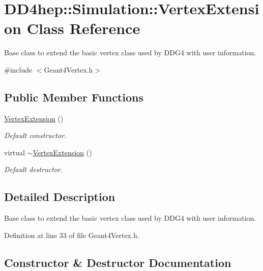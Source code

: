 \hypertarget{class_d_d4hep_1_1_simulation_1_1_vertex_extension}{}\section{D\+D4hep\+:\+:Simulation\+:\+:Vertex\+Extension Class Reference}
\label{class_d_d4hep_1_1_simulation_1_1_vertex_extension}


Base class to extend the basic vertex class used by D\+D\+G4 with user information.  




{\ttfamily \#include $<$Geant4\+Vertex.\+h$>$}

\subsection*{Public Member Functions}
\begin{DoxyCompactItemize}
\item 
\hyperlink{class_d_d4hep_1_1_simulation_1_1_vertex_extension_a5e6f2f75331b2ce06e47e37af6d8e413}{Vertex\+Extension} ()
\begin{DoxyCompactList}\small\item\em Default constructor. \end{DoxyCompactList}\item 
virtual \hyperlink{class_d_d4hep_1_1_simulation_1_1_vertex_extension_ada5f206230fe61718826c4cfe8eb7e9e}{$\sim$\+Vertex\+Extension} ()
\begin{DoxyCompactList}\small\item\em Default destructor. \end{DoxyCompactList}\end{DoxyCompactItemize}


\subsection{Detailed Description}
Base class to extend the basic vertex class used by D\+D\+G4 with user information. 

Definition at line 33 of file Geant4\+Vertex.\+h.



\subsection{Constructor \& Destructor Documentation}
\hypertarget{class_d_d4hep_1_1_simulation_1_1_vertex_extension_a5e6f2f75331b2ce06e47e37af6d8e413}{}\label{class_d_d4hep_1_1_simulation_1_1_vertex_extension_a5e6f2f75331b2ce06e47e37af6d8e413} 
